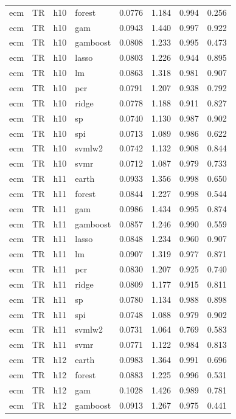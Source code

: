 \begin{ThreePartTable}
\begin{longtable}[t]{llclcccc}
ecm & TR & h10 & forest & 0.0776 & 1.184 & 0.994 & 0.256\\
ecm & TR & h10 & gam & 0.0943 & 1.440 & 0.997 & 0.922\\
ecm & TR & h10 & gamboost & 0.0808 & 1.233 & 0.995 & 0.473\\
ecm & TR & h10 & lasso & 0.0803 & 1.226 & 0.944 & 0.895\\
ecm & TR & h10 & lm & 0.0863 & 1.318 & 0.981 & 0.907\\
ecm & TR & h10 & pcr & 0.0791 & 1.207 & 0.938 & 0.792\\
ecm & TR & h10 & ridge & 0.0778 & 1.188 & 0.911 & 0.827\\
ecm & TR & h10 & sp & 0.0740 & 1.130 & 0.987 & 0.902\\
ecm & TR & h10 & spi & 0.0713 & 1.089 & 0.986 & 0.622\\
ecm & TR & h10 & svmlw2 & 0.0742 & 1.132 & 0.908 & 0.844\\
ecm & TR & h10 & svmr & 0.0712 & 1.087 & 0.979 & 0.733\\
\addlinespace
ecm & TR & h11 & earth & 0.0933 & 1.356 & 0.998 & 0.650\\
ecm & TR & h11 & forest & 0.0844 & 1.227 & 0.998 & 0.544\\
ecm & TR & h11 & gam & 0.0986 & 1.434 & 0.995 & 0.874\\
ecm & TR & h11 & gamboost & 0.0857 & 1.246 & 0.990 & 0.559\\
ecm & TR & h11 & lasso & 0.0848 & 1.234 & 0.960 & 0.907\\
ecm & TR & h11 & lm & 0.0907 & 1.319 & 0.977 & 0.871\\
ecm & TR & h11 & pcr & 0.0830 & 1.207 & 0.925 & 0.740\\
ecm & TR & h11 & ridge & 0.0809 & 1.177 & 0.915 & 0.811\\
ecm & TR & h11 & sp & 0.0780 & 1.134 & 0.988 & 0.898\\
ecm & TR & h11 & spi & 0.0748 & 1.088 & 0.979 & 0.902\\
ecm & TR & h11 & svmlw2 & 0.0731 & 1.064 & 0.769 & 0.583\\
ecm & TR & h11 & svmr & 0.0771 & 1.122 & 0.984 & 0.813\\
\addlinespace
ecm & TR & h12 & earth & 0.0983 & 1.364 & 0.991 & 0.696\\
ecm & TR & h12 & forest & 0.0883 & 1.225 & 0.996 & 0.531\\
ecm & TR & h12 & gam & 0.1028 & 1.426 & 0.989 & 0.781\\
ecm & TR & h12 & gamboost & 0.0913 & 1.267 & 0.975 & 0.441\\

\end{longtable}
\end{ThreePartTable}
